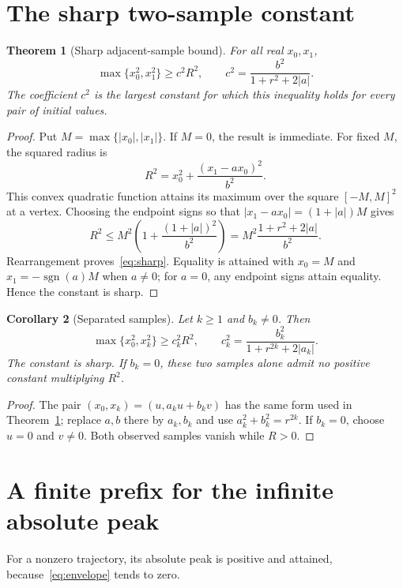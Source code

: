 \documentclass[11pt,a4paper]{article}
\newtheorem{theorem}{Theorem}\newtheorem{proposition}[theorem]{Proposition}\newtheorem{lemma}[theorem]{Lemma}\newtheorem{corollary}[theorem]{Corollary}\theoremstyle{definition}\newtheorem{definition}[theorem]{Definition}\newtheorem{example}[theorem]{Example}
\begin{document}
\section{The sharp two-sample constant}
\begin{theorem}[Sharp adjacent-sample bound]\label{thm:two}
For all real $x_0,x_1$,
\begin{equation}\label{eq:sharp}
 \boxed{\max\{x_0^2,x_1^2\}\ge c^2R^2,
 \qquad c^2=\frac{b^2}{1+r^2+2|a|}.}
\end{equation}
The coefficient $c^2$ is the largest constant for which this inequality
holds for every pair of initial values.
\end{theorem}
\begin{proof}
Put $M=\max\{|x_0|,|x_1|\}$. If $M=0$, the result is immediate.
For fixed $M$, the squared radius is
\[
 R^2=x_0^2+\frac{(x_1-a x_0)^2}{b^2}.
\]
This convex quadratic function attains its maximum over the square
$[-M,M]^2$ at a vertex. Choosing the endpoint signs so that
$|x_1-a x_0|=(1+|a|)M$ gives
\[
 R^2\le M^2\left(1+\frac{(1+|a|)^2}{b^2}\right)
 =M^2\frac{1+r^2+2|a|}{b^2}.
\]
Rearrangement proves~\eqref{eq:sharp}. Equality is attained with
$x_0=M$ and $x_1=-\operatorname{sgn}(a)M$ when $a\ne0$; for $a=0$,
any endpoint signs attain equality. Hence the constant is sharp.
\end{proof}

\begin{corollary}[Separated samples]\label{cor:separated}
Let $k\ge1$ and $b_k\ne0$. Then
\begin{equation}\label{eq:separated}
 \max\{x_0^2,x_k^2\}\ge c_k^2R^2,\qquad
 c_k^2=\frac{b_k^2}{1+r^{2k}+2|a_k|}.
\end{equation}
The constant is sharp. If $b_k=0$, these two samples alone admit no
positive constant multiplying $R^2$.
\end{corollary}
\begin{proof}
The pair $(x_0,x_k)=(u,a_ku+b_kv)$ has the same form used in
Theorem~\ref{thm:two}; replace $a,b$ there by $a_k,b_k$ and use
$a_k^2+b_k^2=r^{2k}$. If $b_k=0$, choose $u=0$ and $v\ne0$.
Both observed samples vanish while $R>0$.
\end{proof}

\section{A finite prefix for the infinite absolute peak}
For a nonzero trajectory, its absolute peak is positive and attained,
because~\eqref{eq:envelope} tends to zero.
\end{document}
